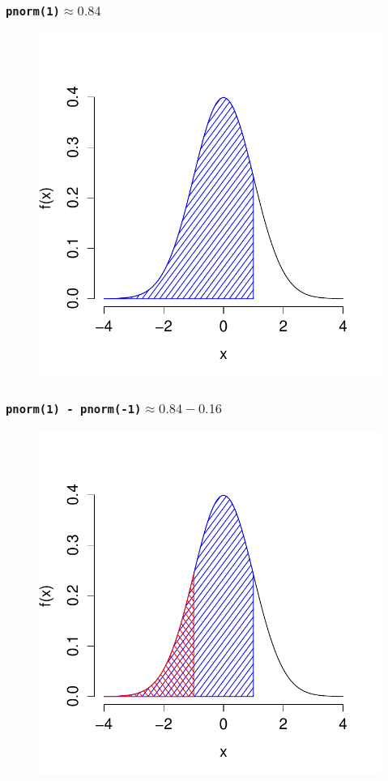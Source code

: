 \documentclass[handout]{beamer}
\begin{document}
\begin{frame}
\frametitle{\texttt{pnorm(1)}$\approx 0.84$}

\begin{figure}
\includegraphics[scale = 0.65]{./images/middle68_1}
\end{figure}
\end{frame}
\begin{frame}
\frametitle{\texttt{pnorm(1) - pnorm(-1)}$\approx 0.84 - 0.16$}
\begin{figure}
\includegraphics[scale = 0.65]{./images/middle68_2}
\end{figure}
\end{frame}
\end{document}
